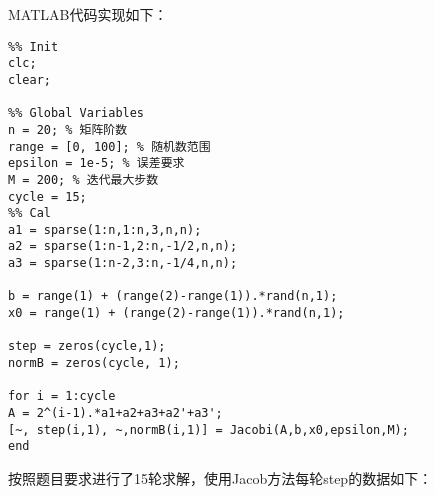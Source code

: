 \documentclass{article}
\begin{document}
MATLAB代码实现如下：
\begin{lstlisting}
%% Init
clc;
clear;

%% Global Variables
n = 20; % 矩阵阶数
range = [0, 100]; % 随机数范围
epsilon = 1e-5; % 误差要求
M = 200; % 迭代最大步数
cycle = 15;
%% Cal
a1 = sparse(1:n,1:n,3,n,n);
a2 = sparse(1:n-1,2:n,-1/2,n,n);
a3 = sparse(1:n-2,3:n,-1/4,n,n);

b = range(1) + (range(2)-range(1)).*rand(n,1);
x0 = range(1) + (range(2)-range(1)).*rand(n,1);

step = zeros(cycle,1);
normB = zeros(cycle, 1);

for i = 1:cycle
A = 2^(i-1).*a1+a2+a3+a2'+a3';
[~, step(i,1), ~,normB(i,1)] = Jacobi(A,b,x0,epsilon,M);
end
\end{lstlisting}
按照题目要求进行了15轮求解，使用Jacob方法每轮step的数据如下：
\end{document}
